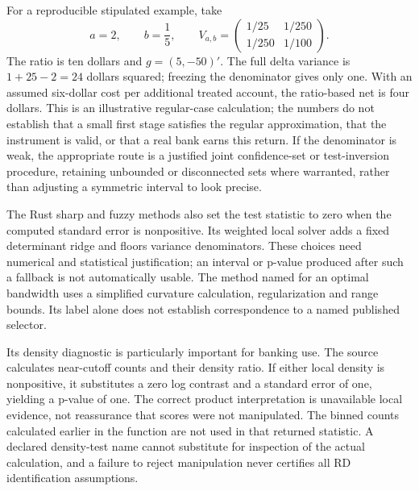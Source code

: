 For a reproducible stipulated example, take
\begin{equation}
 a=2,\qquad b=\frac15,\qquad
 V_{a,b}=\begin{pmatrix}1/25&1/250\\1/250&1/100\end{pmatrix}.
 \label{exec23:otheriv-example}
\end{equation}
The ratio is ten dollars and $g=(5,-50)'$. The full delta variance is
$1+25-2=24$ dollars squared; freezing the denominator gives only one.
With an assumed six-dollar cost per additional treated account, the
ratio-based net is four dollars. This is an illustrative regular-case
calculation; the numbers do not establish that a small first stage
satisfies the regular approximation, that the instrument is valid, or
that a real bank earns this return. If the denominator is weak, the
appropriate route is a justified joint confidence-set or test-inversion
procedure, retaining unbounded or disconnected sets where warranted,
rather than adjusting a symmetric interval to look precise.
\citep{exec23_otheriv_reference}

The Rust sharp and fuzzy methods also set the test statistic to zero
when the computed standard error is nonpositive. Its weighted local
solver adds a fixed determinant ridge and floors variance denominators.
These choices need numerical and statistical justification; an interval
or p-value produced after such a fallback is not automatically usable.
The method named for an optimal bandwidth uses a simplified curvature
calculation, regularization and range bounds. Its label alone does not
establish correspondence to a named published selector.
\citep{exec23_otheriv_source_4}

Its density diagnostic is particularly important for banking use. The
source calculates near-cutoff counts and their density ratio. If either
local density is nonpositive, it substitutes a zero log contrast and a
standard error of one, yielding a p-value of one. The correct product
interpretation is unavailable local evidence, not reassurance that
scores were not manipulated. The binned counts calculated earlier in
the function are not used in that returned statistic. A declared
density-test name cannot substitute for inspection of the actual
calculation, and a failure to reject manipulation never certifies all
RD identification assumptions.
\citep{exec23_otheriv_source_4,exec23_otheriv_reference}

